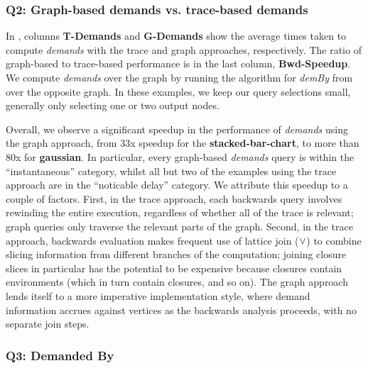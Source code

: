 {\small}

\subsubsection{Q2: Graph-based demands vs. trace-based demands}

In , columns \textbf{T-Demands} and \textbf{G-Demands} show the average times taken
to compute \textit{demands} with the trace and graph approaches, respectively. The ratio of graph-based to
trace-based performance is in the last column, \textbf{Bwd-Speedup}. We compute \textit{demands} over
the graph by running the algorithm for \textit{demBy} from  over the
opposite graph. In these examples, we keep our query selections small, generally only selecting one or two
output nodes.

Overall, we observe a significant speedup in the performance of \textit{demands} using the graph approach,
from 33x speedup for the \textbf{stacked-bar-chart}, to more than 80x for \textbf{gaussian}. In particular,
every graph-based \textit{demands} query is within the ``instantaneous'' category, whilst all but two of the
examples using the trace approach are in the ``noticable delay'' category. We attribute this speedup to a
couple of factors. First, in the trace approach, each backwards query involves rewinding the entire execution,
regardless of whether all of the trace is relevant; graph queries only traverse the relevant parts of the
graph. Second, in the trace approach, backwards evaluation makes frequent use of lattice join ($\vee$) to
combine slicing information from different branches of the computation; joining closure slices in particular
has the potential to be expensive because closures contain environments (which in turn contain closures, and
so on). The graph approach lends itself to a more imperative implementation style, where demand information
accrues against vertices as the backwards analysis proceeds, with no separate join steps.

{\small}

\subsubsection{Q3: Demanded By}

